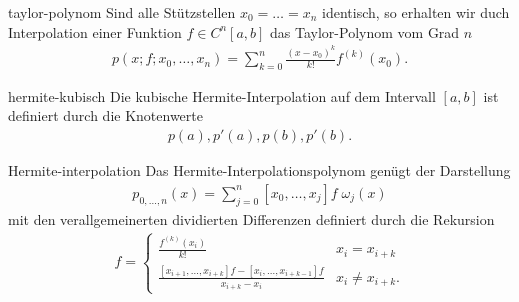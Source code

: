 \begin{Beispiel}{taylor-polynom}
  Sind alle Stützstellen $x_0 = \dots = x_n$ identisch, so erhalten
  wir duch Interpolation einer Funktion $f\in C^n[a,b]$ das
  Taylor-Polynom vom Grad $n$
  \begin{gather}
    p(x;f;x_0,\dots,x_n) = \sum_{k=0}^n \frac{(x-x_0)^k}{k!} f^{(k)}(x_0).
  \end{gather}
\end{Beispiel}

\begin{Beispiel}{hermite-kubisch}
  Die kubische Hermite-Interpolation auf dem Intervall $[a,b]$ ist
  definiert durch die Knotenwerte
  \begin{gather}
    p(a), p'(a), p(b), p'(b).
  \end{gather}
\end{Beispiel}

\begin{Satz}{Hermite-interpolation}
  Das Hermite-Interpolationspolynom genügt der Darstellung
  \begin{gather}
    p_{0,\dots,n}(x) = \sum_{j=0}^n [x_0,\dots,x_j]f\;\omega_j(x)
  \end{gather}
  mit den verallgemeinerten dividierten Differenzen definiert durch
  die Rekursion
  \begin{gather}
    [x_i,\dots,x_{i+k}]f =
    \begin{cases}
      \frac{f^{(k)}(x_i)}{k!} &x_i=x_{i+k}\\
      \frac{[x_{i+1},\dots,x_{i+k}]f - [x_i,\dots,x_{i+k-1}]f}{x_{i+k}-x_i}
      &x_i\neq x_{i+k}.
    \end{cases}
  \end{gather}
\end{Satz}

